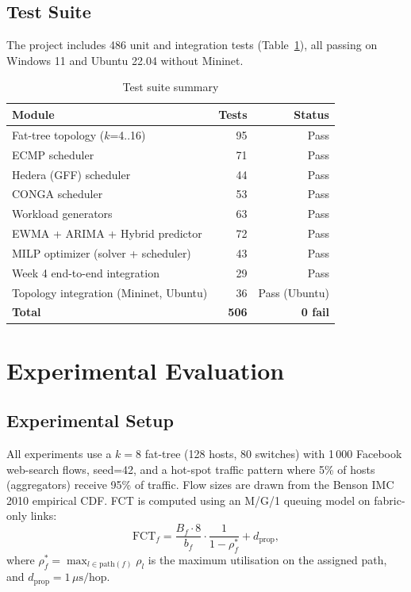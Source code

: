 \documentclass[runningheads]{llncs}
\begin{document}
\subsection{Test Suite}

The project includes 486 unit and integration tests (Table~\ref{tab:tests}), all passing on Windows 11 and Ubuntu 22.04 without Mininet.

\begin{table}[t]
\centering
\caption{Test suite summary}
\label{tab:tests}
\begin{tabular}{lrr}
\toprule
Module & Tests & Status \\
\midrule
Fat-tree topology ($k$=4..16) & 95 & Pass \\
ECMP scheduler & 71 & Pass \\
Hedera (GFF) scheduler & 44 & Pass \\
CONGA scheduler & 53 & Pass \\
Workload generators & 63 & Pass \\
EWMA + ARIMA + Hybrid predictor & 72 & Pass \\
MILP optimizer (solver + scheduler) & 43 & Pass \\
Week 4 end-to-end integration & 29 & Pass \\
Topology integration (Mininet, Ubuntu) & 36 & Pass (Ubuntu) \\
\midrule
\textbf{Total} & \textbf{506} & \textbf{0 fail} \\
\bottomrule
\end{tabular}
\end{table}

\section{Experimental Evaluation}
\label{sec:eval}

\subsection{Experimental Setup}

All experiments use a $k{=}8$ fat-tree (128 hosts, 80 switches) with 1\,000 Facebook web-search flows, seed=42, and a hot-spot traffic pattern where 5\% of hosts (aggregators) receive 95\% of traffic. Flow sizes are drawn from the Benson IMC 2010 empirical CDF. FCT is computed using an M/G/1 queuing model on fabric-only links:
\[
  \text{FCT}_f = \frac{B_f \cdot 8}{b_f} \cdot \frac{1}{1 - \rho^*_f} + d_{\text{prop}},
\]
where $\rho^*_f = \max_{l \in \text{path}(f)} \rho_l$ is the maximum utilisation on the assigned path, and $d_{\text{prop}} = 1\,\mu\text{s/hop}$.
\end{document}
